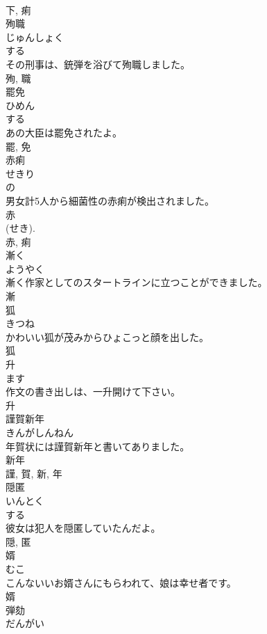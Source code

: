 \documentclass[8pt]{extreport}
\begin{document}
\begin{CJK}{UTF8}{min}
\\	下, 痢	
\\	殉職	
\\	じゅんしょく	
\\	する 
\\	その刑事は、銃弾を浴びて殉職しました。	
\\	殉, 職	
\\	罷免	
\\	ひめん	
\\	する 
\\	あの大臣は罷免されたよ。	
\\	罷, 免	
\\	赤痢	
\\	せきり	
\\	の 
\\	男女計5人から細菌性の赤痢が検出されました。	
\\	赤 
\\	(せき). 
\\	赤, 痢	
\\	漸く	
\\	ようやく	
\\	漸く作家としてのスタートラインに立つことができました。	
\\	漸	
\\	狐	
\\	きつね	
\\	かわいい狐が茂みからひょこっと顔を出した。	
\\	狐	
\\	升	
\\	ます	
\\	作文の書き出しは、一升開けて下さい。	
\\	升	
\\	謹賀新年	
\\	きんがしんねん	
\\	年賀状には謹賀新年と書いてありました。	
\\	新年 
\\	謹, 賀, 新, 年	
\\	隠匿	
\\	いんとく	
\\	する 
\\	彼女は犯人を隠匿していたんだよ。	
\\	隠, 匿	
\\	婿	
\\	むこ	
\\	こんないいお婿さんにもらわれて、娘は幸せ者です。	
\\	婿	
\\	弾劾	
\\	だんがい	

\end{CJK}
\end{document}
